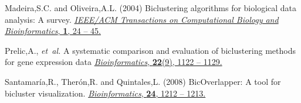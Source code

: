 \documentclass[round]{bioinfo}
\begin{document}
\begin{thebibliography}{6}
Madeira,S.C. and Oliveira,A.L. (2004)
Biclustering algorithms for biological data analysis: A survey.
\href{http://dx.doi.org/10.1109/TCBB.2004.2}{\emph{IEEE/ACM Transactions on Computational Biology and Bioinformatics}, {\bf 1}, 24 -- 45.}

Prelic,A., \emph{et~al.} 
A systematic comparison and evaluation of biclustering methods for gene expression data 
\href{http://dx.doi.org/10.1093/bioinformatics/bt1060}{\emph{Bioinformatics}, {\bf 22}(9), 1122 -- 1129.}

Santamar\'ia,R., Ther\'on,R. and Quintales,L. (2008)
BicOverlapper: A tool for bicluster visualization. 
\href{http://dx.doi.org/10.1093/bioinformatics/btn076}{\emph{Bioinformatics}, {\bf 24}, 1212 -- 1213.}

\end{thebibliography}
\end{document}
